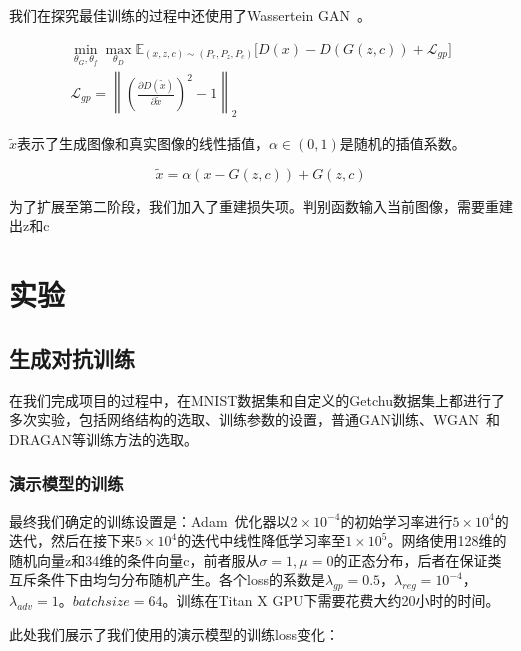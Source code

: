 \documentclass[a4paper,12pt,UTF8]{ctexart}
\newcommand{\norm}[1]{\left\lVert#1\right\rVert}
\begin{document}
我们在探究最佳训练的过程中还使用了Wassertein GAN~\cite{2017arXiv170107875A}。

\begin{align}
  \min_{\theta_G,\theta_f} \max_{\theta_D} \mathbb{E}_{(x, z, c) \sim (P_r, P_z, P_c)} \Big[ D(x) - D(G(z, c)) + \mathcal{L}_{gp} \Big] \\
  \mathcal{L}_{gp} = \norm{\left(\frac{\partial D(\tilde x)}{\partial \tilde x}\right)^2 - 1 }_2
\end{align}

$\tilde x$表示了生成图像和真实图像的线性插值，$\alpha \in (0, 1)$是随机的插值系数。

\begin{equation}
  \tilde x = \alpha (x - G(z, c)) + G(z, c)
\end{equation}

为了扩展至第二阶段，我们加入了重建损失项。判别函数输入当前图像，需要重建出z和c



\section{实验}

\subsection{生成对抗训练}

在我们完成项目的过程中，在MNIST数据集和自定义的Getchu数据集上都进行了多次实验，包括网络结构的选取、训练参数的设置，普通GAN训练、WGAN~\cite{2017arXiv170107875A}和DRAGAN等训练方法的选取。

\subsubsection{演示模型的训练}

最终我们确定的训练设置是：Adam~\cite{Kingma2014Adam}优化器以$2 \times 10^{-4}$的初始学习率进行$5 \times 10^{4}$的迭代，然后在接下来$5 \times 10^{4}$的迭代中线性降低学习率至$1 \times 10^{5}$。网络使用128维的随机向量z和34维的条件向量c，前者服从$\sigma=1, \mu=0$的正态分布，后者在保证类互斥条件下由均匀分布随机产生。各个loss的系数是$\lambda_{gp}=0.5$，$\lambda_{reg}=10^{-4}$，$\lambda_{adv}=1$。$batchsize=64$。训练在Titan X GPU下需要花费大约20小时的时间。

此处我们展示了我们使用的演示模型的训练loss变化：
\end{document}

